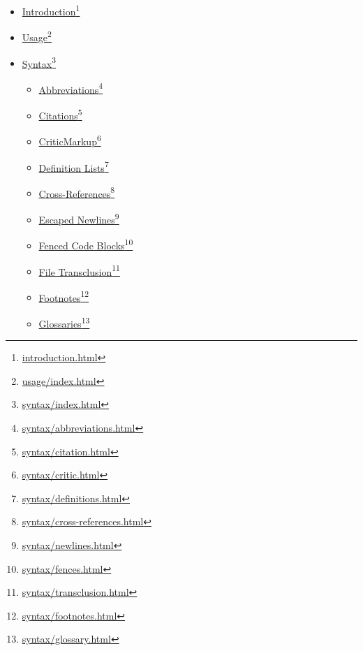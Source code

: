 \begin{itemize}
\item \href{introduction.html}{Introduction}\footnote{\href{introduction.html}{introduction.html}}

\item \href{usage/index.html}{Usage}\footnote{\href{usage/index.html}{usage\slash index.html}}

\item \href{syntax/index.html}{Syntax}\footnote{\href{syntax/index.html}{syntax\slash index.html}}

\begin{itemize}
\item \href{syntax/abbreviations.html}{Abbreviations}\footnote{\href{syntax/abbreviations.html}{syntax\slash abbreviations.html}}

\item \href{syntax/citation.html}{Citations}\footnote{\href{syntax/citation.html}{syntax\slash citation.html}}

\item \href{syntax/critic.html}{CriticMarkup}\footnote{\href{syntax/critic.html}{syntax\slash critic.html}}

\item \href{syntax/definitions.html}{Definition Lists}\footnote{\href{syntax/definitions.html}{syntax\slash definitions.html}}

\item \href{syntax/cross-references.html}{Cross-References}\footnote{\href{syntax/cross-references.html}{syntax\slash cross-references.html}}

\item \href{syntax/newlines.html}{Escaped Newlines}\footnote{\href{syntax/newlines.html}{syntax\slash newlines.html}}

\item \href{syntax/fences.html}{Fenced Code Blocks}\footnote{\href{syntax/fences.html}{syntax\slash fences.html}}

\item \href{syntax/transclusion.html}{File Transclusion}\footnote{\href{syntax/transclusion.html}{syntax\slash transclusion.html}}

\item \href{syntax/footnotes.html}{Footnotes}\footnote{\href{syntax/footnotes.html}{syntax\slash footnotes.html}}

\item \href{syntax/glossary.html}{Glossaries}\footnote{\href{syntax/glossary.html}{syntax\slash glossary.html}}


\end{itemize}
\end{itemize}
